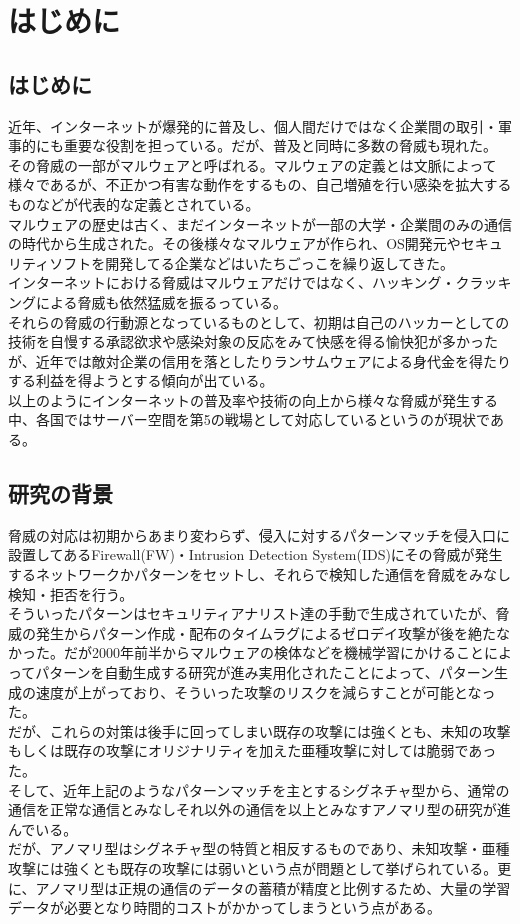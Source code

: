\chapter{はじめに}
\section{はじめに}
近年、インターネットが爆発的に普及し、個人間だけではなく企業間の取引・軍事的にも重要な役割を担っている。だが、普及と同時に多数の脅威も現れた。\\
その脅威の一部がマルウェアと呼ばれる。マルウェアの定義とは文脈によって様々であるが、不正かつ有害な動作をするもの、自己増殖を行い感染を拡大するものなどが代表的な定義とされている。\\
マルウェアの歴史は古く、まだインターネットが一部の大学・企業間のみの通信の時代から生成された。その後様々なマルウェアが作られ、OS開発元やセキュリティソフトを開発してる企業などはいたちごっこを繰り返してきた。\\
インターネットにおける脅威はマルウェアだけではなく、ハッキング・クラッキングによる脅威も依然猛威を振るっている。\\
それらの脅威の行動源となっているものとして、初期は自己のハッカーとしての技術を自慢する承認欲求や感染対象の反応をみて快感を得る愉快犯が多かったが、近年では敵対企業の信用を落としたりランサムウェアによる身代金を得たりする利益を得ようとする傾向が出ている。\\
以上のようにインターネットの普及率や技術の向上から様々な脅威が発生する中、各国ではサーバー空間を第5の戦場として対応しているというのが現状である。\\

\section{研究の背景}
脅威の対応は初期からあまり変わらず、侵入に対するパターンマッチを侵入口に設置してあるFirewall(FW)・Intrusion Detection System(IDS)にその脅威が発生するネットワークかパターンをセットし、それらで検知した通信を脅威をみなし検知・拒否を行う。\\
そういったパターンはセキュリティアナリスト達の手動で生成されていたが、脅威の発生からパターン作成・配布のタイムラグによるゼロデイ攻撃が後を絶たなかった。だが2000年前半からマルウェアの検体などを機械学習にかけることによってパターンを自動生成する研究が進み実用化されたことによって、パターン生成の速度が上がっており、そういった攻撃のリスクを減らすことが可能となった。\\
だが、これらの対策は後手に回ってしまい既存の攻撃には強くとも、未知の攻撃もしくは既存の攻撃にオリジナリティを加えた亜種攻撃に対しては脆弱であった。\\
そして、近年上記のようなパターンマッチを主とするシグネチャ型から、通常の通信を正常な通信とみなしそれ以外の通信を以上とみなすアノマリ型の研究が進んでいる。\\
だが、アノマリ型はシグネチャ型の特質と相反するものであり、未知攻撃・亜種攻撃には強くとも既存の攻撃には弱いという点が問題として挙げられている。更に、アノマリ型は正規の通信のデータの蓄積が精度と比例するため、大量の学習データが必要となり時間的コストがかかってしまうという点がある。\\


